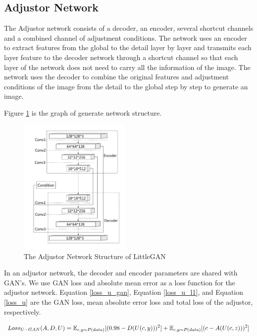 \subsection{Adjustor Network}
The Adjustor network consists of a decoder, an encoder, several shortcut channels and a combined channel of adjustment conditions.
The network uses an encoder to extract features from the global to the detail layer by layer and transmits each layer feature to the decoder network through a shortcut channel so that each layer of the network does not need to carry all the information of the image.
The network uses the decoder to combine the original features and adjustment conditions of the image from the detail to the global step by step to generate an image.

Figure \ref{net_adjustor} is the graph of generate network structure.

\begin{figure}
    \begin{center}
    \includegraphics[width=0.48\textwidth]{figures/net_adjustor.pdf}
    \caption{The Adjustor Network Structure of LittleGAN}
    \label{net_adjustor}
    \end{center}
\end{figure}

In an adjustor network, the decoder and encoder parameters are shared with GAN's.
We use GAN loss and absolute mean error as a loss function for the adjustor network.
Equation \eqref{loss_u_gan}, Equation \eqref{loss_u_l1}, and Equation \eqref{loss_u} are the GAN loss, mean absolute error loss and total loss of the adjustor, respectively.

\begin{equation}
    Loss_{U-GAN}(A,D,U)=
    \mathbb{E}_{c,y\thicksim P(data)}[(0.98-D(U(c,y)))^2]+
    \mathbb{E}_{c,y\thicksim P(data)}[(c-A(U(c,z)))^2]
    \label{loss_u_gan}
\end{equation}

